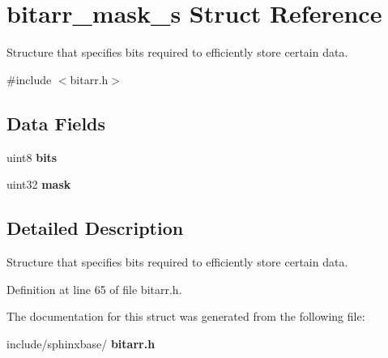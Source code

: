 \section{bitarr\+\_\+mask\+\_\+s Struct Reference}
\label{structbitarr__mask__s}


Structure that specifies bits required to efficiently store certain data.  




{\ttfamily \#include $<$bitarr.\+h$>$}

\subsection*{Data Fields}
\begin{DoxyCompactItemize}
\item 
\mbox{\label{structbitarr__mask__s_a47b05f707efd5233f021bb1276c79b7a}} 
uint8 {\bfseries bits}
\item 
\mbox{\label{structbitarr__mask__s_a034b318c56cbc15befef989a2521623c}} 
uint32 {\bfseries mask}
\end{DoxyCompactItemize}


\subsection{Detailed Description}
Structure that specifies bits required to efficiently store certain data. 

Definition at line 65 of file bitarr.\+h.



The documentation for this struct was generated from the following file\+:\begin{DoxyCompactItemize}
\item 
include/sphinxbase/\textbf{ bitarr.\+h}\end{DoxyCompactItemize}

